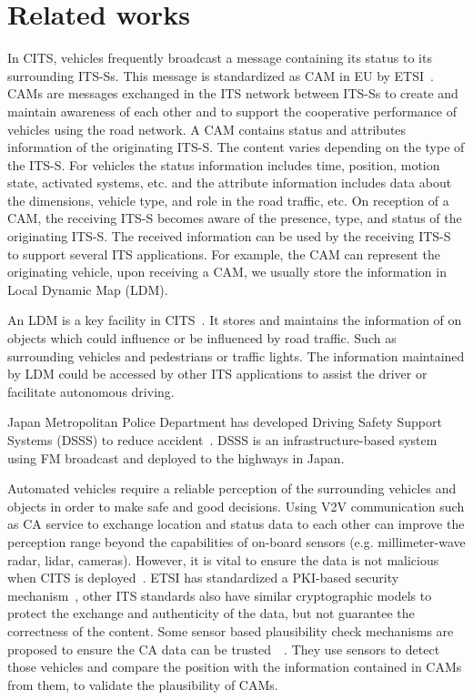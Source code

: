 \section{Related works} \label{sec:related_works}

In CITS, vehicles frequently broadcast a message containing its status to its surrounding ITS-Ss.
This message is standardized as CAM  in EU by ETSI~\cite{etsi2014302}.
CAMs are messages exchanged in the ITS network between ITS-Ss to create and maintain awareness of each other
and to support the cooperative performance of vehicles using the road network.
A CAM contains status and attributes information of the originating ITS-S.
The content varies depending on the type of the ITS-S.
For vehicles the status information includes time, position, motion state, activated systems,
etc. and the attribute information includes data about the dimensions,
vehicle type, and role in the road traffic, etc.
On reception of a CAM, the receiving ITS-S becomes aware of the presence, type, and status of the originating ITS-S.
The received information can be used by the receiving ITS-S to support several ITS applications.
For example, the CAM can represent the originating vehicle, upon receiving a CAM,
we usually store the information in Local Dynamic Map (LDM).

An LDM is a key facility in CITS~\cite{etsi2014302895}.
It stores and maintains the information of on objects which could influence or be influenced by road traffic.
Such as surrounding vehicles and pedestrians or traffic lights.
The information maintained by LDM could be accessed by other ITS applications to assist the driver or facilitate autonomous driving.

Japan Metropolitan Police Department has developed Driving Safety Support Systems (DSSS) to reduce accident~\cite{yamamoto2006aichi}.
DSSS is an infrastructure-based system using FM broadcast and deployed to the highways in Japan.

Automated vehicles require a reliable perception of the surrounding vehicles and objects in order to make safe and good decisions.
Using V2V communication such as CA service to exchange location and status data to
each other can improve the perception range beyond the capabilities of on-board sensors (e.g. millimeter-wave radar, lidar, cameras).
However, it is vital to ensure the data is not malicious when CITS is deployed~\cite{amoozadeh2015security}.
ETSI has standardized a PKI-based security mechanism~\cite{etsi2013103},
other ITS standards also have similar cryptographic models to protect the exchange and authenticity of the data,
but not guarantee the correctness of the content.
Some sensor based plausibility check mechanisms are proposed to ensure the CA data can be trusted~\cite{obst2014multi}~\cite{dhurandher2014vehicular}.
They use sensors to detect those vehicles and compare the position with the information contained in CAMs from them, to validate the plausibility of CAMs.

